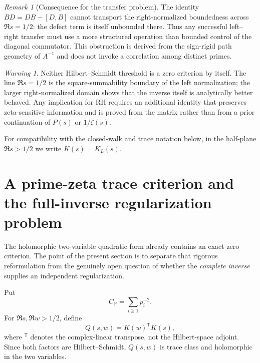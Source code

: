\documentclass[11pt]{amsart}
\numberwithin{equation}{section}
\theoremstyle{plain}
\theoremstyle{definition}
\theoremstyle{remark}
\newtheorem{remark}[theorem]{Remark}
\newtheorem{warning}[theorem]{Warning}
\begin{document}
\begin{remark}[Consequence for the transfer problem]
\label{rem:naive_transfer_consequence}
The identity $B D=D B-[D,B]$ cannot transport the right-normalized boundedness across $\Re s=1/2$: the defect term is itself unbounded there.  Thus any successful left--right transfer must use a more structured operation than bounded control of the diagonal commutator.  This obstruction is derived from the sign-rigid path geometry of $A^{-1}$ and does not invoke a correlation among distinct primes.
\end{remark}

\begin{warning}
\label{warn:half_plane_not_rh}
Neither Hilbert--Schmidt threshold is a zero criterion by itself.  The line $\Re s=1/2$ is the square-summability boundary of the left normalization; the larger right-normalized domain shows that the inverse itself is analytically better behaved.  Any implication for RH requires an additional identity that preserves zeta-sensitive information and is proved from the matrix rather than from a prior continuation of $P(s)$ or $1/\zeta(s)$.
\end{warning}

\medskip
For compatibility with the closed-walk and trace notation below, in the half-plane $\Re s>1/2$ we write $K(s)=K_L(s)$.

\section{A prime-zeta trace criterion and the full-inverse regularization problem}
\label{sec:prime_zeta_trace}

The holomorphic two-variable quadratic form already contains an exact zero criterion.  The point of the present section is to separate that rigorous reformulation from the genuinely open question of whether the \emph{complete inverse} supplies an independent regularization.

Put
\begin{equation}
C_{\mathbb P}=\sum_{i\ge1}p_i^{-2}.
\label{eq:prime_square_constant}
\end{equation}
For $\Re s,\Re w>1/2$, define
\begin{equation}
Q(s,w)=K(w)^{\mathsf T}K(s),
\label{eq:Q_prime_zeta_definition}
\end{equation}
where $^{\mathsf T}$ denotes the complex-linear transpose, not the Hilbert-space adjoint.  Since both factors are Hilbert--Schmidt, $Q(s,w)$ is trace class and holomorphic in the two variables.
\end{document}
